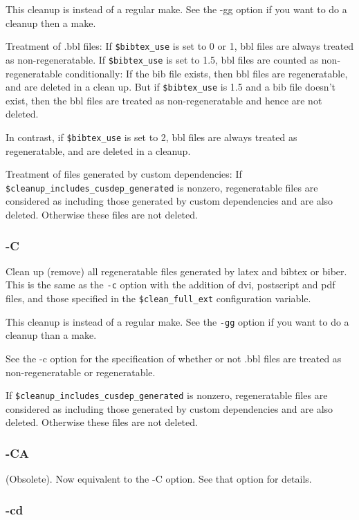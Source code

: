 This  cleanup  is instead of a regular make.  See the -gg option if you want to
do a cleanup then a make.

Treatment of .bbl files:  If \verb|$bibtex_use| is set to 0 or  1, bbl files  are
always treated as non-regeneratable.  If \verb|$bibtex_use| is set to 1.5, bbl files
are counted as non-regeneratable conditionally:  If the bib file exists, then
bbl files are regeneratable, and are deleted in a clean up.  But if
\verb|$bibtex_use| is  1.5 and  a bib file doesn't exist, then the bbl files are
treated as non-regeneratable and hence are not deleted.

In contrast, if \verb|$bibtex_use| is set to 2, bbl  files  are  always
treated as regeneratable, and are deleted in a cleanup.

Treatment   of   files  generated  by  custom  dependencies:  If
\verb|$cleanup_includes_cusdep_generated|  is  nonzero,   regeneratable files  are
considered as including those generated by custom dependencies and are also
deleted.  Otherwise these files are  not deleted.


\subsubsection{-C}

Clean up (remove) all regeneratable files generated by latex and bibtex or
biber.  This is the same as the \verb|-c| option with the addition  of dvi,
postscript and pdf files, and those specified in the \verb|$clean_full_ext|
configuration variable.

This cleanup is instead of a regular make.  See the  \verb|-gg|  option
if you want to do a cleanup than a make.

See  the  -c option for the specification of whether or not .bbl files are
treated as non-regeneratable or regeneratable.

If \verb|$cleanup_includes_cusdep_generated| is nonzero,  regeneratable files
are considered as including those generated by custom dependencies and are also
deleted.  Otherwise these files are  not deleted.


\subsubsection{-CA}

(Obsolete).   Now  equivalent to the -C option.  See that option for details.


\subsubsection{-cd}

